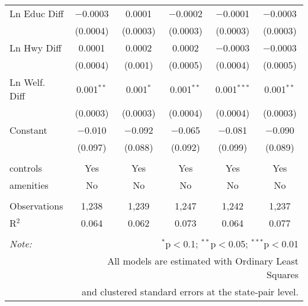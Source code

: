 \begin{table}[!htbp]
\begin{tabular}{@{\extracolsep{5pt}}lccccc}
  Ln Educ Diff & $-$0.0003 & 0.0001 & $-$0.0002 & $-$0.0001 & $-$0.0003 \\ 
  & (0.0004) & (0.0003) & (0.0003) & (0.0003) & (0.0003) \\ 
  Ln Hwy Diff & 0.0001 & 0.0002 & 0.0002 & $-$0.0003 & $-$0.0003 \\ 
  & (0.0004) & (0.001) & (0.0005) & (0.0004) & (0.0005) \\ 
  Ln Welf. Diff & 0.001$^{**}$ & 0.001$^{*}$ & 0.001$^{**}$ & 0.001$^{***}$ & 0.001$^{**}$ \\ 
  & (0.0003) & (0.0003) & (0.0004) & (0.0004) & (0.0003) \\ 
  Constant & $-$0.010 & $-$0.092 & $-$0.065 & $-$0.081 & $-$0.090 \\ 
  & (0.097) & (0.088) & (0.092) & (0.099) & (0.089) \\ 
 \hline \\[-1.8ex] 
controls & Yes & Yes & Yes & Yes & Yes \\ 
amenities & No & No & No & No & No \\ 
\hline \\[-1.8ex] 
Observations & 1,238 & 1,239 & 1,247 & 1,242 & 1,237 \\ 
R$^{2}$ & 0.064 & 0.062 & 0.073 & 0.064 & 0.077 \\ 
\hline 
\hline \\[-1.8ex] 
\textit{Note:}  & \multicolumn{5}{r}{$^{*}$p$<$0.1; $^{**}$p$<$0.05; $^{***}$p$<$0.01} \\ 
 & \multicolumn{5}{r}{All models are estimated with Ordinary Least Squares} \\ 
 & \multicolumn{5}{r}{and clustered standard errors at the state-pair level.} \\ 
\end{tabular} 
\end{table} 
